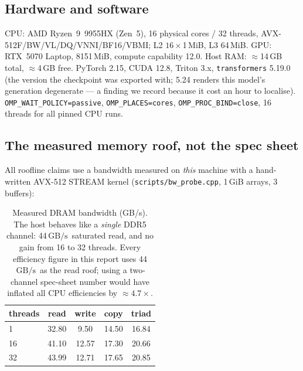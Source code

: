 \documentclass[11pt]{article}
\newcommand{\code}[1]{\texttt{\small #1}}
\newcommand{\gbps}{\ensuremath{\,\mathrm{GB/s}}}
\begin{document}
\subsection{Hardware and software}
CPU: AMD Ryzen~9~9955HX (Zen~5), 16 physical cores / 32 threads, AVX-512F\allowbreak/BW\allowbreak/VL\allowbreak/DQ\allowbreak/VNNI\allowbreak/BF16\allowbreak/VBMI; L2 $16\times$1\,MiB, L3 64\,MiB. GPU: RTX~5070 Laptop, 8151\,MiB, compute
capability 12.0. Host RAM: $\approx$14\,GB total, $\approx$4\,GB free. PyTorch 2.15,
CUDA 12.8, Triton 3.x, \code{transformers} 5.19.0 (the version the checkpoint was
exported with; 5.24 renders this model's generation degenerate --- a finding we record
because it cost an hour to localise). \code{OMP\_WAIT\_POLICY\allowbreak=passive},
\code{OMP\_PLACES=cores}, \code{OMP\_PROC\_BIND=close}, 16 threads for all pinned CPU
runs.

\subsection{The measured memory roof, not the spec sheet}
All roofline claims use a bandwidth measured on \emph{this} machine with a hand-written
AVX-512 STREAM kernel (\code{scripts/bw\_probe.cpp}, 1\,GiB arrays, 3 buffers):

\begin{table}[h]\centering\small
\begin{tabular}{lcccc}
\toprule
threads & read & write & copy & triad\\
\midrule
1  & 32.80 & 9.50 & 14.50 & 16.84 \\
16 & 41.10 & 12.57 & 17.30 & 20.66 \\
32 & 43.99 & 12.71 & 17.65 & 20.85 \\
\bottomrule
\end{tabular}
\caption{Measured DRAM bandwidth (GB/s). The host behaves like a \emph{single} DDR5
channel: 44\gbps\ saturated read, and no gain from 16 to 32 threads. Every efficiency
figure in this report uses 44\gbps\ as the read roof; using a two-channel spec-sheet
number would have inflated all CPU efficiencies by $\approx4.7\times$.}
\end{table}
\end{document}
